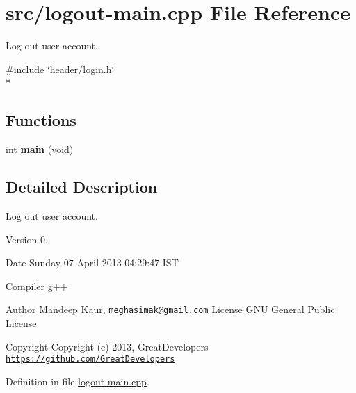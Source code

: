 \hypertarget{logout-main_8cpp}{\section{src/logout-\/main.cpp File Reference}
\label{logout-main_8cpp}
}


Log out user account.  


{\ttfamily \#include \char`\"{}header/login.\-h\char`\"{}}\\*
\subsection*{Functions}
\begin{DoxyCompactItemize}
\item 
\hypertarget{logout-main_8cpp_a840291bc02cba5474a4cb46a9b9566fe}{int {\bfseries main} (void)}\label{logout-main_8cpp_a840291bc02cba5474a4cb46a9b9566fe}

\end{DoxyCompactItemize}


\subsection{Detailed Description}
Log out user account. \begin{DoxyVersion}{Version}
0. 
\end{DoxyVersion}
\begin{DoxyDate}{Date}
Sunday 07 April 2013 04\-:29\-:47 I\-S\-T\par
 Compiler g++
\end{DoxyDate}
\begin{DoxyAuthor}{Author}
Mandeep Kaur, \href{mailto:meghasimak@gmail.com}{\tt meghasimak@gmail.\-com} License G\-N\-U General Public License 
\end{DoxyAuthor}
\begin{DoxyCopyright}{Copyright}
Copyright (c) 2013, Great\-Developers \href{https://github.com/GreatDevelopers}{\tt https\-://github.\-com/\-Great\-Developers} 
\end{DoxyCopyright}


Definition in file \hyperlink{logout-main_8cpp_source}{logout-\/main.\-cpp}.

